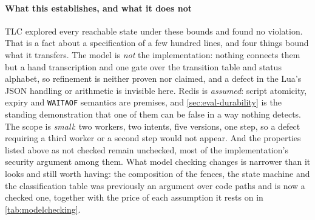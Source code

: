 \paragraph{What this establishes, and what it does not} TLC explored every
reachable state under these bounds and found no violation. That is a fact about
a specification of a few hundred lines, and four things bound what it transfers.
The model is \emph{not} the implementation: nothing connects them but a hand
transcription and one gate over the transition table and status alphabet, so
refinement is neither proven nor claimed, and a defect in the Lua's JSON
handling or arithmetic is invisible here. Redis is \emph{assumed}: script
atomicity, expiry and \texttt{WAITAOF} semantics are premises, and
\cref{sec:eval-durability} is the standing demonstration that one of them can be
false in a way nothing detects. The scope is \emph{small}: two workers, two
intents, five versions, one step, so a defect requiring a third worker or a
second step would not appear. And the properties listed above as not checked
remain unchecked, most of the implementation's security argument among them.
What model checking changes is narrower than it looks and still worth having:
the composition of the fences, the state machine and the classification table
was previously an argument over code paths and is now a checked one, together
with the price of each assumption it rests on in \cref{tab:modelchecking}.
